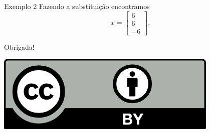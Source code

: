 \documentclass[]{beamer}
\begin{document}
\begin{frame}{Exemplo 2}
Fazendo a substituição encontramos  $$x=\begin{bmatrix}6\\ 6\\ -6\end{bmatrix}.$$
\end{frame}


\begin{frame}
\vfill
\vfill
\vfill
\begin{center}
\Huge Obrigada!
\end{center}
\vfill
\vfill
\begin{center}
\href{http://creativecommons.org/licenses/by/4.0/}{\includegraphics{figures/by.png}} \end{center}

\end{frame}
\end{document}
